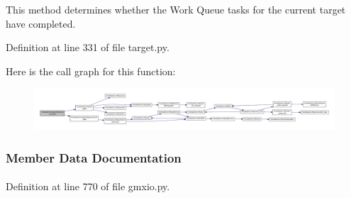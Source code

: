 \-This method determines whether the \-Work \-Queue tasks for the current target have completed. 



\-Definition at line 331 of file target.\-py.



\-Here is the call graph for this function\-:\nopagebreak
\begin{figure}[H]
\begin{center}
\leavevmode
\includegraphics[width=350pt]{classforcebalance_1_1target_1_1Target_af6099ec09486213869dba2491bd8ea04_cgraph}
\end{center}
\end{figure}




\subsubsection{\-Member \-Data \-Documentation}
\hypertarget{classforcebalance_1_1gmxio_1_1Interaction__GMX_a2060ffbc14f19f77a55c68731885136d}{
\paragraph[{\-Diel\-\_\-\-B}]{}}\label{classforcebalance_1_1gmxio_1_1Interaction__GMX_a2060ffbc14f19f77a55c68731885136d}


\-Definition at line 770 of file gmxio.\-py.

\hypertarget{classforcebalance_1_1gmxio_1_1Interaction__GMX_a3e290441adf952aef43d80d025aa1ea7}{
\paragraph[{\-Dielectric}]{}}\label{classforcebalance_1_1gmxio_1_1Interaction__GMX_a3e290441adf952aef43d80d025aa1ea7}


